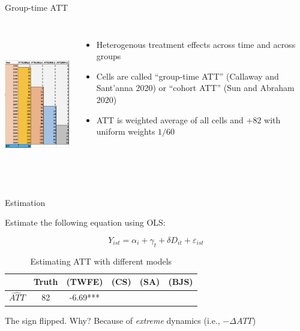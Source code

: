 \documentclass{beamer}
\begin{document}
\begin{frame}{Group-time ATT}
       \begin{columns}
             \centering
             \includegraphics[height=6.5cm, width=5.5cm]{./lecture_includes/baker_attgt}
		\begin{itemize}
\item Heterogenous treatment effects across time and across groups
\item Cells are called ``group-time ATT'' (Callaway and Sant'anna 2020) or ``cohort ATT'' (Sun and Abraham 2020)
\item ATT is weighted average of all cells and $+82$ with uniform weights $1/60$
		\end{itemize}
         \end{columns} 
    \end{frame}

\begin{frame}{Estimation}

\bigskip

Estimate the following equation using OLS:

$$Y_{ist} = \alpha_i + \gamma_t +\delta D_{it} + \varepsilon_{ist}$$


\begin{table}[htbp]\centering
\small
\caption{Estimating ATT with different models}
\begin{center}
\begin{tabular}{l*{5}{c}}
\hline
\multicolumn{1}{l}{\textbf{}}&
\multicolumn{1}{c}{\textbf{Truth}}&
\multicolumn{1}{c}{\textbf{(TWFE)}}&
\multicolumn{1}{c}{\textbf{(CS)}}&
\multicolumn{1}{c}{\textbf{(SA)}}&
\multicolumn{1}{c}{\textbf{(BJS)}}\\
\hline
$\widehat{ATT}$  & 82    & -6.69*** &&&\\
\hline
\end{tabular}
\end{center}
\end{table}

The sign flipped.  Why?  Because of \emph{extreme} dynamics (i.e., $- \Delta ATT$)

\end{frame}
\end{document}
